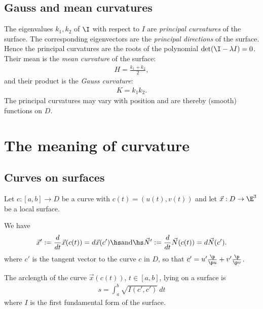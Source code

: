 \documentclass{article}
\begin{document}
\subsection{Gauss and mean curvatures}

\begin{definition}
    The eigenvalues $k_1,k_2$ of $\I$ with respect to $I$ are \emph{principal curvatures} of the surface.
    The corresponding eigenvectors are the \emph{principal directions} of the surface. Hence the
    principal curvatures are the roots of the polynomial $\det(\I-\lambda I)=0$. Their mean is the
    \emph{mean curvature} of the surface:
    \begin{align*}
        H=\frac{k_1+k_2}{2},
    \end{align*}
    and their product is the \emph{Gauss curvature}:
    \begin{align*}
        K = k_1k_2.
    \end{align*}
    The principal curvatures may vary with position and are thereby (smooth) functions on $D$.
\end{definition}

\section{The meaning of curvature}

\subsection{Curves on surfaces}

Let $c:[a,b]\to D$ be a curve with $c(t)=(u(t),v(t))$ and let $\vec x: D\to\E^3$ be a 
local surface.

\begin{lemma}
    We have 
    \begin{align*}
        \vec x' := \frac{d}{dt}\vec x(c(t)) = d\vec x(c')\hs\text{and}\hs 
        \vec N' := \frac{d}{dt}\vec N(c(t)) = d\vec N(c').
    \end{align*}
    where $c'$ is the tangent vector to the curve $c$ in $D$, so that 
    $c'=u'\frac{\p }{\p u}+v'\frac{\p }{\p v}$.
\end{lemma}

\begin{proposition}
    The arclength of the curve $\vec x(c(t))$, $t\in[a,b]$, lying on a surface is 
    \begin{align*}
        s = \int_a^b \sqrt{I(c',c')}\:dt
    \end{align*}
    where $I$ is the first fundamental form of the surface.
\end{proposition}
\end{document}
